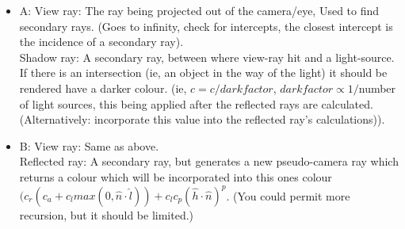 \begin{itemize}

\item A:
View ray: The ray being projected out of the camera/eye, Used to find secondary rays. (Goes to infinity, check for intercepts, the closest intercept is the incidence of a secondary ray). \\
Shadow ray: A secondary ray, between where view-ray hit and a light-source. If there is an intersection (ie, an object in the way of the light) it should be rendered have a darker colour. (ie, $c = c / darkfactor $, $darkfactor \propto 1/$number of light sources, this being applied after the reflected rays are calculated. (Alternatively: incorporate this value into the reflected ray's calculations)). \\

\item B:
View ray: Same as above. \\
Reflected ray: A secondary ray, but generates a new pseudo-camera ray which returns a colour which will be incorporated into this ones colour $(c_r(c_a + c_l max (0, \hat n \cdot \hat l ) ) + c_l c_p (\hat h \cdot \hat n)^p$. (You could permit more recursion, but it should be limited.)


%
\end{itemize}
